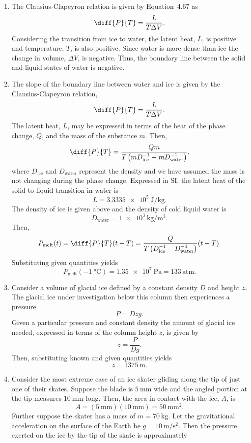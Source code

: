 \documentclass[a4paper, 12pt]{config/homework}
\begin{document}
\begin{enumerate}[label=\textbf{(\alph*)}]
\item The Clausius-Clapeyron relation is given by Equation~4.67 as
\[\diff{P}{T} = \frac{L}{T\Delta V}.\]
Considering the transition from ice to water, the latent heat, \(L\), is positive and temperature, \(T\), is also positive. Since water is more dense than ice the change in volume, \(\Delta V\), is negative. Thus, the boundary line between the solid and liquid states of water is negative.
\bigskip
\item The slope of the boundary line between water and ice is given by the Clausius-Clapeyron relation,
\[\diff{P}{T} = \frac{L}{T\Delta V}.\]
The latent heat, \(L\), may be expressed in terms of the heat of the phase change, \(Q\), and the mass of the substance \(m\). Then,
\[\diff{P}{T} = \frac{Qm}{T \left(mD_\text{ice}^{-1} - mD_\text{water}^{-1}\right)},\]
where \(D_\text{ice}\) and \(D_\text{water}\) represent the density and we have assumed the mass is not changing during the phase change. Expressed in SI, the latent heat of the solid to liquid transition in water is
\[L = \qty{3.3335e5}{\joule\per\kilogram}.\]
The density of ice is given above and the density of cold liquid water is
\[D_\text{water} = \qty{1e3}{\kg\per\meter\cubed}.\]
Then,
\[P_\text{melt}(t) = \diff{P}{T}(t-T) = \frac{Q}{T \left(D_\text{ice}^{-1} - D_\text{water}^{-1}\right)}(t-T).\]
Substituting given quantities yields
\[P_\text{melt}(\qty{-1}{\celsius}) = \qty{1.35e7}{\pascal} = 133\,\text{atm}.\]
\bigskip
\item Consider a volume of glacial ice defined by a constant density \(D\) and height \(z\). The glacial ice under investigation below this column then experiences a pressure
\[P = Dzg.\]
Given a particular pressure and constant density the amount of glacial ice needed, expressed in terms of the column height \(z\), is given by
\[z = \frac{P}{Dg}.\]
Then, substituting known and given quantities yields
\[z = \qty{1375}{\meter}.\]
\bigskip
\item Consider the most extreme case of an ice skater gliding along the tip of just one of their skates. Suppose the blade is \(\qty{5}{\milli\meter}\) wide and the angled portion at the tip measures \(\qty{10}{\milli\meter}\) long. Then, the area in contact with the ice, \(A\), is
\[A = \left(\qty{5}{\milli\meter}\right)\left(\qty{10}{\milli\meter}\right) = \qty{50}{\milli\meter\squared}.\]
Further suppose the skater has a mass of \(m=\qty{70}{\kilogram}\). Let the gravitational acceleration on the surface of the Earth be \(g=\qty{10}{\meter\per\second\squared}\). Then the pressure exerted on the ice by the tip of the skate is approximately

\end{enumerate}
\end{document}
